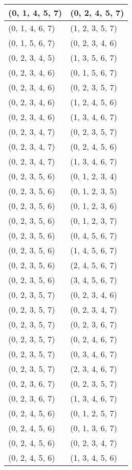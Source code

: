 \begin{footnotesize}
\begin{longtable}[c]{|l|l|}
\\ \hline
(0, 1, 4, 5, 7)
&(0, 2, 4, 5, 7)
\\ \hline
(0, 1, 4, 6, 7)
&(1, 2, 3, 5, 7)
\\ \hline
(0, 1, 5, 6, 7)
&(0, 2, 3, 4, 6)
\\ \hline
(0, 2, 3, 4, 5)
&(1, 3, 5, 6, 7)
\\ \hline
(0, 2, 3, 4, 6)
&(0, 1, 5, 6, 7)
\\ \hline
(0, 2, 3, 4, 6)
&(0, 2, 3, 5, 7)
\\ \hline
(0, 2, 3, 4, 6)
&(1, 2, 4, 5, 6)
\\ \hline
(0, 2, 3, 4, 6)
&(1, 3, 4, 6, 7)
\\ \hline
(0, 2, 3, 4, 7)
&(0, 2, 3, 5, 7)
\\ \hline
(0, 2, 3, 4, 7)
&(0, 2, 4, 5, 6)
\\ \hline
(0, 2, 3, 4, 7)
&(1, 3, 4, 6, 7)
\\ \hline
(0, 2, 3, 5, 6)
&(0, 1, 2, 3, 4)
\\ \hline
(0, 2, 3, 5, 6)
&(0, 1, 2, 3, 5)
\\ \hline
(0, 2, 3, 5, 6)
&(0, 1, 2, 3, 6)
\\ \hline
(0, 2, 3, 5, 6)
&(0, 1, 2, 3, 7)
\\ \hline
(0, 2, 3, 5, 6)
&(0, 4, 5, 6, 7)
\\ \hline
(0, 2, 3, 5, 6)
&(1, 4, 5, 6, 7)
\\ \hline
(0, 2, 3, 5, 6)
&(2, 4, 5, 6, 7)
\\ \hline
(0, 2, 3, 5, 6)
&(3, 4, 5, 6, 7)
\\ \hline
(0, 2, 3, 5, 7)
&(0, 2, 3, 4, 6)
\\ \hline
(0, 2, 3, 5, 7)
&(0, 2, 3, 4, 7)
\\ \hline
(0, 2, 3, 5, 7)
&(0, 2, 3, 6, 7)
\\ \hline
(0, 2, 3, 5, 7)
&(0, 2, 4, 6, 7)
\\ \hline
(0, 2, 3, 5, 7)
&(0, 3, 4, 6, 7)
\\ \hline
(0, 2, 3, 5, 7)
&(2, 3, 4, 6, 7)
\\ \hline
(0, 2, 3, 6, 7)
&(0, 2, 3, 5, 7)
\\ \hline
(0, 2, 3, 6, 7)
&(1, 3, 4, 6, 7)
\\ \hline
(0, 2, 4, 5, 6)
&(0, 1, 2, 5, 7)
\\ \hline
(0, 2, 4, 5, 6)
&(0, 1, 3, 6, 7)
\\ \hline
(0, 2, 4, 5, 6)
&(0, 2, 3, 4, 7)
\\ \hline
(0, 2, 4, 5, 6)
&(1, 3, 4, 5, 6)
\\ \hline

\end{longtable}
\end{footnotesize}
